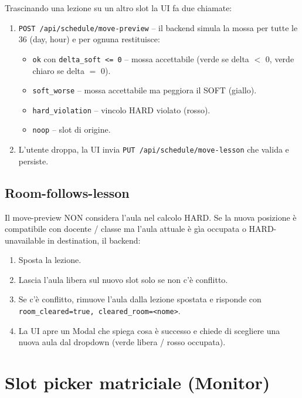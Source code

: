 Trascinando una lezione su un altro slot la UI fa due chiamate:

\begin{enumerate}
  \item \texttt{POST /api/schedule/move-preview} -- il backend simula
        la mossa per tutte le 36 (day, hour) e per ognuna restituisce:
        \begin{itemize}
          \item \texttt{ok} con \texttt{delta\_soft <= 0} -- mossa
                accettabile (verde se delta $<$ 0, verde chiaro
                se delta $=$ 0).
          \item \texttt{soft\_worse} -- mossa accettabile ma peggiora
                il SOFT (giallo).
          \item \texttt{hard\_violation} -- vincolo HARD violato
                (rosso).
          \item \texttt{noop} -- slot di origine.
        \end{itemize}
  \item L'utente droppa, la UI invia \texttt{PUT
        /api/schedule/move-lesson} che valida e persiste.
\end{enumerate}

\subsection{Room-follows-lesson}

Il move-preview NON considera l'aula nel calcolo HARD. Se la nuova
posizione \`e compatibile con docente / classe ma l'aula attuale
\`e g\`ia occupata o HARD-unavailable in destination, il backend:

\begin{enumerate}
  \item Sposta la lezione.
  \item Lascia l'aula libera sul nuovo slot solo se non c'\`e conflitto.
  \item Se c'\`e conflitto, rimuove l'aula dalla lezione spostata e
        risponde con \texttt{room\_cleared=true, cleared\_room=<nome>}.
  \item La UI apre un Modal che spiega cosa \`e successo e chiede di
        scegliere una nuova aula dal dropdown (verde libera / rosso
        occupata).
\end{enumerate}

\section{Slot picker matriciale (Monitor)}

